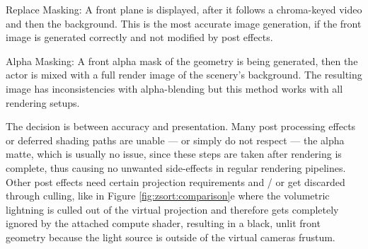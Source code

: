 \begin{my_list}
	\item Replace Masking: A front plane is displayed, after it follows a 
	chroma-keyed video and then the background. This is the most accurate image 
	generation, if the front image is generated correctly and not modified by 
	post effects.
	\item Alpha Masking: A front alpha mask of the geometry is being generated, 
	then the actor is mixed with a full render image of the scenery's
	background. The resulting image has inconsistencies with alpha-blending but 
	this method works with all rendering setups.
\end{my_list}

The decision is between accuracy and presentation. Many post processing effects 
or deferred shading paths are unable --- or simply do not respect --- the 
alpha matte, which is usually no issue, since these steps are taken after 
rendering is complete, thus causing no unwanted side-effects in regular 
rendering pipelines. Other post effects need certain projection requirements 
and / or get discarded through culling, like in Figure 
\ref{fig:zsort:comparison}e where the volumetric lightning is culled out of the 
virtual projection and therefore gets completely ignored by the attached 
compute shader, resulting in a black, unlit front geometry because the light 
source is outside of the virtual cameras frustum. 

